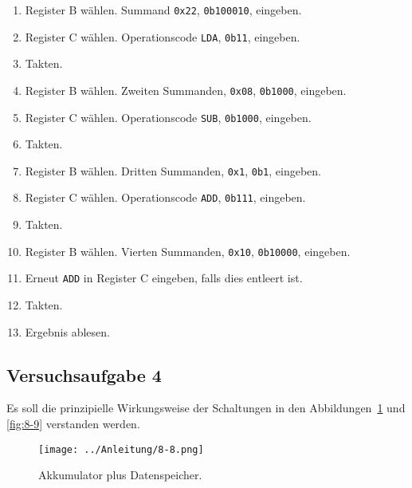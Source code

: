 \begin{enumerate}
	\item
		Register B wählen. Summand \texttt{0x22}, \texttt{0b100010}, eingeben.

	\item
		Register C wählen. Operationscode \texttt{LDA}, \texttt{0b11},
		eingeben.

	\item
		Takten.

	\item
		Register B wählen. Zweiten Summanden, \texttt{0x08}, \texttt{0b1000},
		eingeben.

	\item
		Register C wählen. Operationscode \texttt{SUB}, \texttt{0b1000},
		eingeben.

	\item
		Takten.

	\item
		Register B wählen. Dritten Summanden, \texttt{0x1}, \texttt{0b1},
		eingeben.

	\item
		Register C wählen. Operationscode \texttt{ADD}, \texttt{0b111},
		eingeben.

	\item
		Takten.

	\item
		Register B wählen. Vierten Summanden, \texttt{0x10}, \texttt{0b10000},
		eingeben.

	\item
		Erneut \texttt{ADD} in Register C eingeben, falls dies entleert ist.

	\item
		Takten.

	\item
		Ergebnis ablesen.
\end{enumerate}

\subsection{Versuchsaufgabe 4}

Es soll die prinzipielle Wirkungsweise der Schaltungen in den
Abbildungen~\ref{fig:8-8} und \ref{fig:8-9} verstanden werden.

\begin{figure}[htbp]
	\centering
	\texttt{[image: ../Anleitung/8-8.png]}
	\caption{%
		Akkumulator plus Datenspeicher.
		\cite[Abbildung~8.8]{physik313-Anleitung}
	}
	\label{fig:8-8}
\end{figure}

